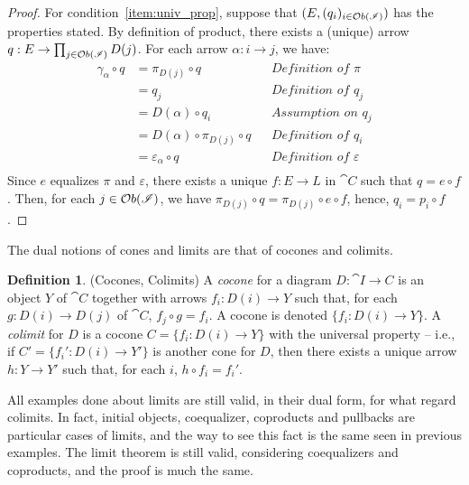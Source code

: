 \documentclass[a4paper, twoside,openright]{report}
\theoremstyle{plain}
\theoremstyle{definition}
\newtheorem{definition}[theorem]{Definition}
\begin{document}
\begin{proof}
    For condition~\ref{item:univ_prop}, suppose that $(E, (q_i)_{i \in \mathcal{O}b(\mathscr{I})})$ has the properties stated. By definition of product, there exists a (unique) arrow $q: E \rightarrow \prod_{j \in \mathcal{O}b(\mathscr{I})}D(j)$. For each arrow $\alpha: i \rightarrow j$, we have:
    \begin{align*}
            \gamma_\alpha \circ q 
                &= \pi_{D(j)} \circ q           && \textit{Definition of $\pi$} \\
                &= q_j                          && \textit{Definition of $q_j$} \\
                &= D(\alpha) \circ q_i          && \textit{Assumption on $q_j$} \\
                &= D(\alpha) \circ \pi_{D(j)} \circ q   &&\textit{Definition of $q_i$} \\
                &= \varepsilon_{\alpha} \circ q && \textit{Definition of $\varepsilon$} \\
    \end{align*}
    Since $e$ equalizes $\pi$ and $\varepsilon$, there exists a unique $f: E \rightarrow L$ in $\cat C$ such that $q = e \circ f$. Then, for each $j \in \mathcal{O}b(\mathscr{I})$, we have $\pi_{D(j)} \circ q = \pi_{D(j)} \circ e \circ f$, hence, $q_i = p_i \circ f$.
\end{proof}

The dual notions of cones and limits are that of cocones and colimits.

\begin{definition}(Cocones, Colimits)
    A \emph{cocone} for a diagram $D: \cat{I \rightarrow C}$ is an object $Y$ of $\cat C$ together with arrows $f_i : D(i) \rightarrow Y$ such that, for each $g: D(i) \rightarrow D(j)$ of $\cat C$, $f_j \circ g = f_i$. A cocone is denoted $\{f_i: D(i) \rightarrow Y \}$.
    A \emph{colimit} for $D$ is a cocone $C = \{f_i: D(i) \rightarrow Y \}$ with the universal property -- i.e., if $C' = \{ f_i' : D(i) \rightarrow Y'\}$ is another cone for $D$, then there exists a unique arrow $h:Y \rightarrow Y'$ such that, for each $i$, $h \circ f_i = f_i'$.
\end{definition}

All examples done about limits are still valid, in their dual form, for what regard colimits. In fact, initial objects, coequalizer, coproducts and pullbacks are particular cases of limits, and the way to see this fact is the same seen in previous examples. The limit theorem is still valid, considering coequalizers and coproducts, and the proof is much the same.
\end{document}
